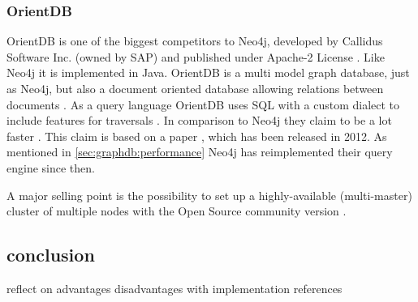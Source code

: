 \subsubsection{OrientDB}
OrientDB is one of the biggest competitors to Neo4j, developed by Callidus Software Inc. (owned by SAP) and published under Apache-2 License \autocite{orientdb:vs_neo4j}.
Like Neo4j it is implemented in Java.
OrientDB is a multi model graph database, just as Neo4j, but also a document oriented database allowing relations between documents \autocite{orientdb:why}.
As a query language OrientDB uses SQL with a custom dialect to include features for traversals \autocite{orientdb:vs_neo4j}.
In comparison to Neo4j they claim to be a lot faster \autocite{orientdb:vs_neo4j}.
This claim is based on a paper \autocite{cloudcom:2012}, which has been released in 2012.
As mentioned in \autoref{sec:graphdb:performance} Neo4j has reimplemented their query engine since then.


A major selling point is the possibility to set up a highly-available (multi-master) cluster of multiple nodes with the Open Source community version \autocite{orientdb:cluster, orientdb:support}.


\subsection{conclusion}
reflect on advantages disadvantages with implementation references
